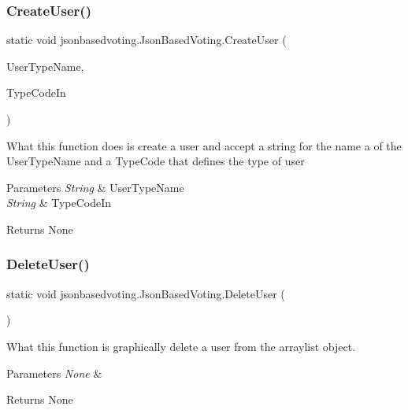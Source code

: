 \subsubsection{\texorpdfstring{CreateUser()}{CreateUser()}}
{\footnotesize\ttfamily static void jsonbasedvoting.\+Json\+Based\+Voting.\+Create\+User (\begin{DoxyParamCaption}\item[{String}]{User\+Type\+Name,  }\item[{String}]{Type\+Code\+In }\end{DoxyParamCaption})\hspace{0.3cm}{\ttfamily [static]}}

What this function does is create a user and accept a string for the name a of the User\+Type\+Name and a Type\+Code that defines the type of user


\begin{DoxyParams}{Parameters}
{\em String} & User\+Type\+Name \\
\hline
{\em String} & Type\+Code\+In \\
\hline
\end{DoxyParams}
\begin{DoxyReturn}{Returns}
None 
\end{DoxyReturn}
\mbox{\label{classjsonbasedvoting_1_1_json_based_voting_ac203bbbbb46504b4239c28d595e1cdfc}} 
\subsubsection{\texorpdfstring{DeleteUser()}{DeleteUser()}}
{\footnotesize\ttfamily static void jsonbasedvoting.\+Json\+Based\+Voting.\+Delete\+User (\begin{DoxyParamCaption}{ }\end{DoxyParamCaption})\hspace{0.3cm}{\ttfamily [static]}}

What this function is graphically delete a user from the arraylist object. 
\begin{DoxyParams}{Parameters}
{\em None} & \\
\hline
\end{DoxyParams}
\begin{DoxyReturn}{Returns}
None 
\end{DoxyReturn}
\mbox{\label{classjsonbasedvoting_1_1_json_based_voting_a1bce9a2d9ca3518b754e4f4506826b7b}} 
